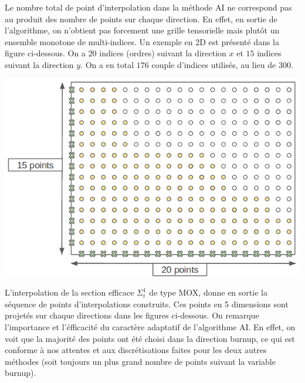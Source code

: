 \hspace{0.5cm} Le nombre total de point d'interpolation dans la méthode AI ne correspond pas au produit des nombre de points sur chaque direction.
En effet, en sortie de l'algorithme, on n'obtient pas forcement une grille tensorielle mais plutôt un ensemble monotone de multi-indices.
Un exemple en 2D est présenté dans la figure ci-dessous. On a $20$ indices (ordres) suivant la direction $x$ et $15$ indices suivant la direction $y$.
On a en total $176$ couple d'indices utilisés, au lieu de $300$.
\begin{center}
\includegraphics[height= 7 cm,width = 0.7\linewidth]{images/nb_discretisation.png}
\end{center}
\hspace{0.5cm} L'interpolation de la section efficace $\Sigma_t^1$ de type MOX, donne en sortie la séquence de points d'interpolations construits.
Ces points en 5 dimensions sont projetés sur chaque directions dans les figures ci-dessous. On remarque l'importance et l'éfficacité du caractère adaptatif de l'algorithme AI.
En effet, on voit que la majorité des points ont été choisi dans la direction burnup, ce qui est conforme à nos attentes et aux discrétisations faites pour les deux autres méthodes (soit toujours un plus grand nombre de points suivant la variable burnup).\\
